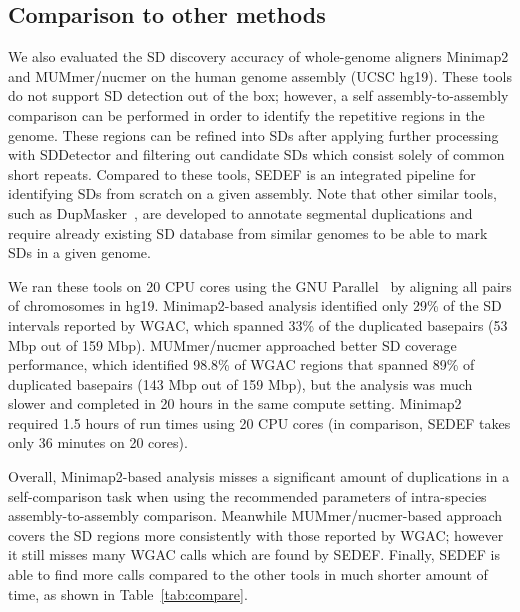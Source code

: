 \documentclass{article}
\begin{document}
\subsection{Comparison to other methods}

We also evaluated the SD discovery accuracy of whole-genome aligners Minimap2 \citep{Li2018} and MUMmer/nucmer \citep{marccais2018mummer4} on the human genome assembly (UCSC hg19). These tools do not support SD detection out of the box; however, a self assembly-to-assembly comparison can be performed in order to identify the repetitive regions in the genome. These regions can be refined into SDs after applying further processing with SDDetector \citep{dallery2017gapless} and filtering out candidate SDs which consist solely of common short repeats.
Compared to these tools, SEDEF is an integrated pipeline for identifying SDs from scratch on a given assembly. Note that other similar tools, such as DupMasker~\citep{jiang2008dupmasker}, are developed to annotate segmental duplications and require already existing SD database from similar genomes to be able to mark SDs in a given genome.

We ran these tools on 20 CPU cores using the GNU Parallel~\citep{Tange2011a} by aligning all pairs of chromosomes in hg19. Minimap2-based analysis identified only 29\% %
of the SD intervals reported by WGAC, which spanned 33\% of the duplicated basepairs (53 Mbp out of 159 Mbp). MUMmer/nucmer approached better SD coverage performance, which identified 98.8\% of WGAC regions %
that spanned 89\% of duplicated basepairs (143 Mbp out of 159 Mbp), but the analysis was much slower and completed in 20 hours in the same compute setting. Minimap2 required 1.5 hours of run times using 20 CPU cores (in comparison, SEDEF takes only 36 minutes on 20 cores). 

Overall, Minimap2-based analysis misses a significant amount of duplications in a self-comparison task when using the recommended parameters of intra-species assembly-to-assembly comparison. Meanwhile MUMmer/nucmer-based approach covers the SD regions more consistently with those reported by WGAC; however it still misses many WGAC calls which are found by SEDEF. Finally, SEDEF is able to find more calls compared to the other tools in much shorter amount of time, as shown in Table~\ref{tab:compare}.
\end{document}
